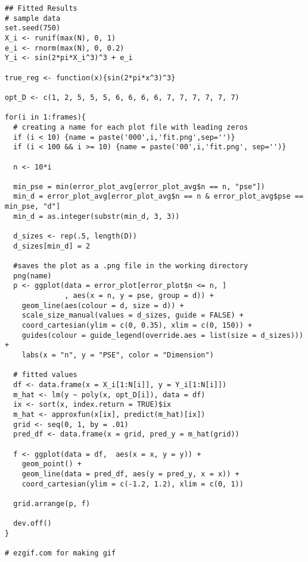 \begin{lstlisting}
## Fitted Results
# sample data
set.seed(750)
X_i <- runif(max(N), 0, 1)
e_i <- rnorm(max(N), 0, 0.2)
Y_i <- sin(2*pi*X_i^3)^3 + e_i

true_reg <- function(x){sin(2*pi*x^3)^3}

opt_D <- c(1, 2, 5, 5, 5, 6, 6, 6, 6, 7, 7, 7, 7, 7, 7)

for(i in 1:frames){
  # creating a name for each plot file with leading zeros
  if (i < 10) {name = paste('000',i,'fit.png',sep='')}
  if (i < 100 && i >= 10) {name = paste('00',i,'fit.png', sep='')}
  
  n <- 10*i
  
  min_pse = min(error_plot_avg[error_plot_avg$n == n, "pse"])
  min_d = error_plot_avg[error_plot_avg$n == n & error_plot_avg$pse == min_pse, "d"]
  min_d = as.integer(substr(min_d, 3, 3))
  
  d_sizes <- rep(.5, length(D))
  d_sizes[min_d] = 2
  
  #saves the plot as a .png file in the working directory
  png(name)
  p <- ggplot(data = error_plot[error_plot$n <= n, ]
              , aes(x = n, y = pse, group = d)) + 
    geom_line(aes(colour = d, size = d)) +
    scale_size_manual(values = d_sizes, guide = FALSE) +
    coord_cartesian(ylim = c(0, 0.35), xlim = c(0, 150)) +
    guides(colour = guide_legend(override.aes = list(size = d_sizes))) + 
    labs(x = "n", y = "PSE", color = "Dimension")
  
  # fitted values
  df <- data.frame(x = X_i[1:N[i]], y = Y_i[1:N[i]])
  m_hat <- lm(y ~ poly(x, opt_D[i]), data = df)
  ix <- sort(x, index.return = TRUE)$ix
  m_hat <- approxfun(x[ix], predict(m_hat)[ix])
  grid <- seq(0, 1, by = .01)
  pred_df <- data.frame(x = grid, pred_y = m_hat(grid))
  
  f <- ggplot(data = df,  aes(x = x, y = y)) + 
    geom_point() +
    geom_line(data = pred_df, aes(y = pred_y, x = x)) +
    coord_cartesian(ylim = c(-1.2, 1.2), xlim = c(0, 1))

  grid.arrange(p, f)
  
  dev.off()
}

# ezgif.com for making gif

\end{lstlisting}
